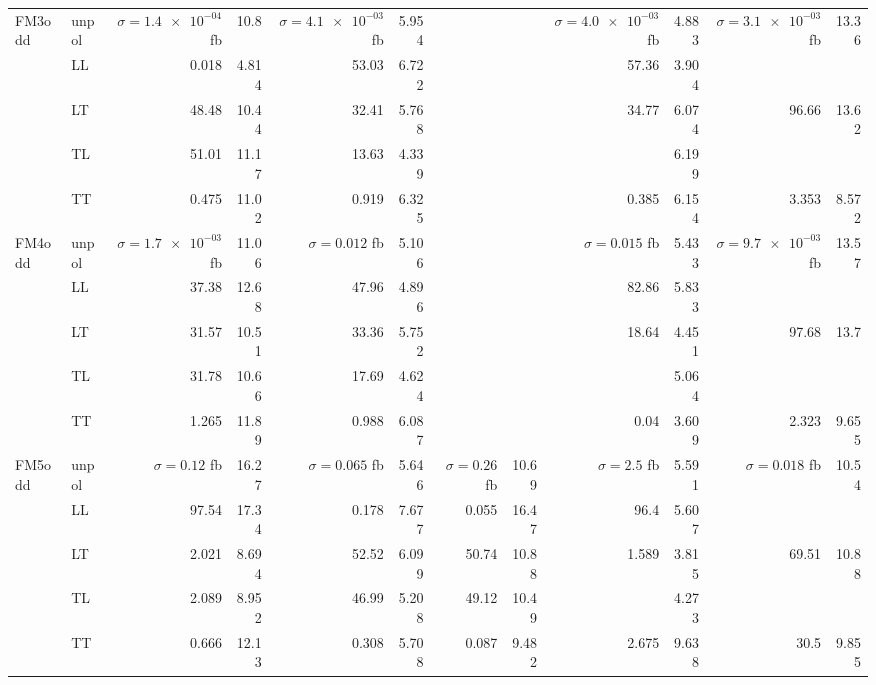 \begin{table}[H]
{\begin{tabular}{llrrrrrrrrrr}
\midrule
\multirow{5}{*}{FM3odd}
 & unpol & $\sigma = \num{1.4e-04}$ fb & \num{10.8} & $\sigma = \num{4.1e-03}$ fb & \num{5.954} &  &  & $\sigma = \num{4.0e-03}$ fb & \num{4.883} & $\sigma = \num{3.1e-03}$ fb & \num{13.36} \\
 & LL & \num{0.018} & \num{4.814} & \num{53.03} & \num{6.722} &  &  & \num{57.36} & \num{3.904} &  &  \\
 & LT & \num{48.48} & \num{10.44} & \num{32.41} & \num{5.768} &  &  & \num{34.77} & \num{6.074} & \num{96.66} & \num{13.62} \\
 & TL & \num{51.01} & \num{11.17} & \num{13.63} & \num{4.339} &  &  &  & \num{6.199} &  &  \\
 & TT & \num{0.475} & \num{11.02} & \num{0.919} & \num{6.325} &  &  & \num{0.385} & \num{6.154} & \num{3.353} & \num{8.572} \\
\midrule
\multirow{5}{*}{FM4odd}
 & unpol & $\sigma = \num{1.7e-03}$ fb & \num{11.06} & $\sigma = \num{0.012}$ fb & \num{5.106} &  &  & $\sigma = \num{0.015}$ fb & \num{5.433} & $\sigma = \num{9.7e-03}$ fb & \num{13.57} \\
 & LL & \num{37.38} & \num{12.68} & \num{47.96} & \num{4.896} &  &  & \num{82.86} & \num{5.833} &  &  \\
 & LT & \num{31.57} & \num{10.51} & \num{33.36} & \num{5.752} &  &  & \num{18.64} & \num{4.451} & \num{97.68} & \num{13.7} \\
 & TL & \num{31.78} & \num{10.66} & \num{17.69} & \num{4.624} &  &  &  & \num{5.064} &  &  \\
 & TT & \num{1.265} & \num{11.89} & \num{0.988} & \num{6.087} &  &  & \num{0.04} & \num{3.609} & \num{2.323} & \num{9.655} \\
\midrule
\multirow{5}{*}{FM5odd}
 & unpol & $\sigma = \num{0.12}$ fb & \num{16.27} & $\sigma = \num{0.065}$ fb & \num{5.646} & $\sigma = \num{0.26}$ fb & \num{10.69} & $\sigma = \num{2.5}$ fb & \num{5.591} & $\sigma = \num{0.018}$ fb & \num{10.54} \\
 & LL & \num{97.54} & \num{17.34} & \num{0.178} & \num{7.677} & \num{0.055} & \num{16.47} & \num{96.4} & \num{5.607} &  &  \\
 & LT & \num{2.021} & \num{8.694} & \num{52.52} & \num{6.099} & \num{50.74} & \num{10.88} & \num{1.589} & \num{3.815} & \num{69.51} & \num{10.88} \\
 & TL & \num{2.089} & \num{8.952} & \num{46.99} & \num{5.208} & \num{49.12} & \num{10.49} &  & \num{4.273} &  &  \\
 & TT & \num{0.666} & \num{12.13} & \num{0.308} & \num{5.708} & \num{0.087} & \num{9.482} & \num{2.675} & \num{9.638} & \num{30.5} & \num{9.855} \\

\end{tabular}}
\end{table}
